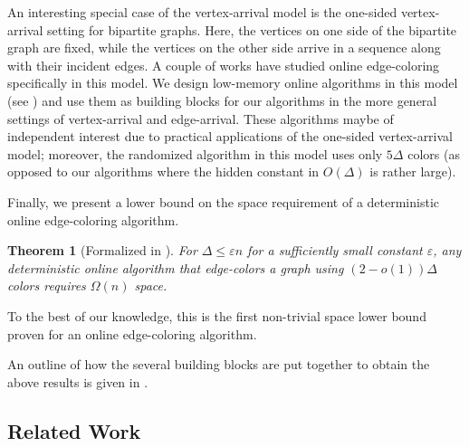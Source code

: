 \documentclass[10pt]{article}
\newtheorem{theorem}{Theorem}[section]
\theoremstyle{definition}\newtheorem{definition}[lemma]{Definition}
\theoremstyle{remark}  \newtheorem*{remark}{Remark}
\newcommand{\eps}{\varepsilon}
\begin{document}
An interesting special case of the vertex-arrival model is the one-sided vertex-arrival setting for bipartite graphs. Here, the vertices on one side of the bipartite graph are fixed, while the vertices on the other side arrive in a sequence along with their incident edges. A couple of works \cite{CohenPW19, NaorSW23} have studied online edge-coloring specifically in this model. We design low-memory online algorithms in this model (see ) and use them as building blocks for our algorithms in the more general settings of vertex-arrival and edge-arrival. These algorithms maybe of independent interest due to practical applications of the one-sided vertex-arrival model; moreover, the randomized algorithm in this model uses only $5\Delta$ colors (as opposed to our algorithms where the hidden constant in $O(\Delta)$ is rather large).  














Finally, we present a lower bound on the space requirement of a deterministic online edge-coloring algorithm. 


\begin{theorem}[Formalized in ]\label{thm:det-online-va-lb}
  For $\Delta\leq \eps n$ for a sufficiently small constant $\eps$, any deterministic online algorithm that edge-colors a graph using $(2-o(1))\Delta$ colors requires $\Omega(n)$ space. 
\end{theorem}

To the best of our knowledge, this is the first non-trivial space lower bound proven for an online edge-coloring algorithm.  




An outline of how the several building blocks are put together to obtain the above results is given in
.

\begin{figure}[omitted: a diagram of this paper's results, not reproduced here]\label{fig:overview}\end{figure}






\subsection{Related Work}\label{sec:related}
\end{document}
